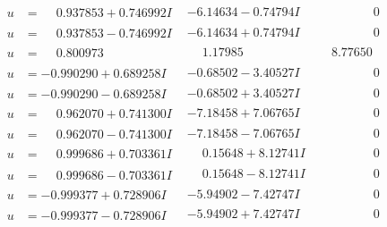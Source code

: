 \documentclass[1p]{elsarticle_modified}
\theoremstyle{definition}
\begin{document}
$$\begin{array}{c|c|c}
\begin{aligned}
u &= \phantom{-}0.937853 + 0.746992 I\end{aligned}
 & -6.14634 - 0.74794 I & \phantom{-0.000000 } 0 \\ \hline\begin{aligned}
u &= \phantom{-}0.937853 - 0.746992 I\end{aligned}
 & -6.14634 + 0.74794 I & \phantom{-0.000000 } 0 \\ \hline\begin{aligned}
u &= \phantom{-}0.800973\phantom{ +0.000000I}\end{aligned}
 & \phantom{-}1.17985\phantom{ +0.000000I} & \phantom{-}8.77650\phantom{ +0.000000I} \\ \hline\begin{aligned}
u &= -0.990290 + 0.689258 I\end{aligned}
 & -0.68502 - 3.40527 I & \phantom{-0.000000 } 0 \\ \hline\begin{aligned}
u &= -0.990290 - 0.689258 I\end{aligned}
 & -0.68502 + 3.40527 I & \phantom{-0.000000 } 0 \\ \hline\begin{aligned}
u &= \phantom{-}0.962070 + 0.741300 I\end{aligned}
 & -7.18458 + 7.06765 I & \phantom{-0.000000 } 0 \\ \hline\begin{aligned}
u &= \phantom{-}0.962070 - 0.741300 I\end{aligned}
 & -7.18458 - 7.06765 I & \phantom{-0.000000 } 0 \\ \hline\begin{aligned}
u &= \phantom{-}0.999686 + 0.703361 I\end{aligned}
 & \phantom{-}0.15648 + 8.12741 I & \phantom{-0.000000 } 0 \\ \hline\begin{aligned}
u &= \phantom{-}0.999686 - 0.703361 I\end{aligned}
 & \phantom{-}0.15648 - 8.12741 I & \phantom{-0.000000 } 0 \\ \hline\begin{aligned}
u &= -0.999377 + 0.728906 I\end{aligned}
 & -5.94902 - 7.42747 I & \phantom{-0.000000 } 0 \\ \hline\begin{aligned}
u &= -0.999377 - 0.728906 I\end{aligned}
 & -5.94902 + 7.42747 I & \phantom{-0.000000 } 0 \\ \hline\begin{aligned}

\end{aligned}
\end{array}$$
\end{document}
